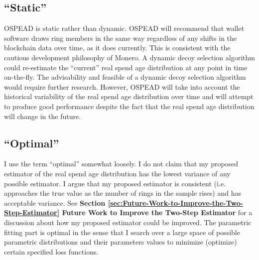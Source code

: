\documentclass[english]{article}
\begin{document}
\subsection{\textquotedblleft Static\textquotedblright}

OSPEAD is static rather than dynamic. OSPEAD will recommend that wallet
software draws ring members in the same way regardless of any shifts
in the blockchain data over time, as it does currently. This is consistent
with the cautious development philosophy of Monero. A dynamic decoy
selection algorithm could re-estimate the ``current'' real spend
age distribution at any point in time on-the-fly. The advisability
and feasible of a dynamic decoy selection algorithm would require
further research. However, OSPEAD will take into account the historical
variability of the real spend age distribution over time and will
attempt to produce good performance despite the fact that the real
spend age distribution will change in the future.

\subsection{\textquotedblleft Optimal\textquotedblright}

I use the term ``optimal'' somewhat loosely. I do not claim that
my proposed estimator of the real spend age distribution has the lowest
variance of any possible estimator. I argue that my proposed estimator
is consistent (i.e. approaches the true value as the number of rings
in the sample rises) and has acceptable variance. See \textbf{Section
\ref{sec:Future-Work-to-Improve-the-Two-Step-Estimator} Future Work
to Improve the Two-Step Estimator} for a discussion about how my proposed
estimator could be improved. The parametric fitting part is optimal
in the sense that I search over a large space of possible parametric
distributions and their parameters values to minimize (optimize) certain
specified loss functions.
\end{document}
